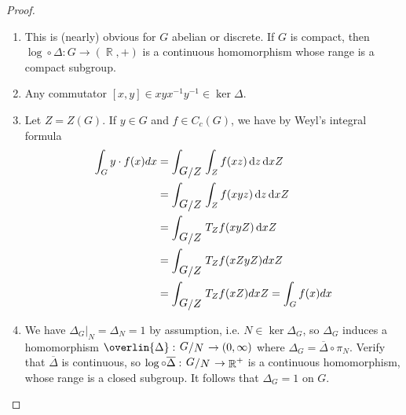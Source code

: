 \documentclass[11pt, a4paper]{memoir}
\DeclareMathOperator{\R}{{\mathbb{R}}}
\theoremstyle{change}
\theoremstyle{plain}
\theoremstyle{nonumberplain}
\newtheorem{proof}{Proof}
\newcommand{\quot}[2]{\mathchoice{\left.\raisebox{0.14em}{$#1$}\middle/\raisebox{-0.14em}{$#2$}\right.}
                                 {\left.\raisebox{0.08em}{$#1$}\middle/\raisebox{-0.08em}{$#2$}\right.}
                                 {\left.\raisebox{0.03em}{$#1$}\middle/\raisebox{-0.03em}{$#2$}\right.}
                                 {\left.\raisebox{0em}{$#1$}\middle/\raisebox{0em}{$#2$}\right.}}
\renewcommand{\d}[1]{\ensuremath{\operatorname{d}\!{#1}}}
\numberwithin{equation}{section}
\begin{document}
\begin{proof}
    \begin{enumerate}[nl,r]
        \item This is (nearly) obvious for $G$ abelian or discrete.
            If $G$ is compact, then $\log\circ\Delta:G\to(\R,+)$ is a continuous homomorphism whose range is a compact subgroup.
        \item Any commutator $[x,y]\in xyx^{-1}y^{-1}\in\ker\Delta$.
        \item Let $Z=Z(G)$.
            If $y\in G$ and $f\in C_c(G)$, we have by Weyl's integral formula
            \begin{align*}
                \int_G y\cdot f(x)dx &= \int_{\quot{G}{Z}}\int_Z f(xz)\d{z}\d{xZ}\\
                                     &= \int_{\quot{G}{Z}}\int_Zf(xyz)\d{z}\d{xZ}\\
                                     &= \int_{\quot{G}{Z}}T_Zf(xyZ)\d{xZ}\\
                                     &= \int_{\quot{G}{Z}}T_Zf(xZyZ)dxZ\\
                                     &= \int_{\quot{G}{Z}}T_Zf(xZ)dxZ=\int_Gf(x)dx
            \end{align*}
        \item We have $\Delta_G|_N=\Delta_N=1$ by assumption, i.e. $N\in\ker\Delta_G$, so $\Delta_G$ induces a homomorphism $\overlin{\Delta}:\quot{G}{N}\to(0,\infty)$ where $\Delta_G=\overline{\Delta}\circ\pi_N$.
            Verify that $\overline{\Delta}$ is continuous, so $\log\circ\overline{\Delta}:\quot{G}{N}\to\R^+$ is a continuous homomorphism, whose range is a closed subgroup.
            It follows that $\Delta_G=1$ on $G$.
    \end{enumerate}
\end{proof}
\end{document}
